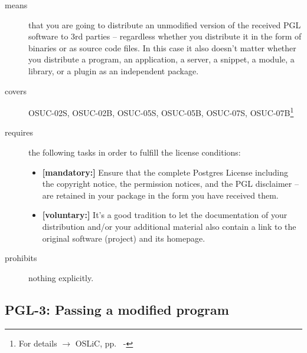\begin{description}

\item[means] that you are going to distribute an unmodified version of the
received PGL software to 3rd parties -- regardless whether you distribute it in
the form of binaries or as source code files. In this case it also
doesn't matter whether you distribute a program, an application, a server, a
snippet, a module, a library, or a plugin as an independent package.

\item[covers] OSUC-02S,  OSUC-02B, OSUC-05S, OSUC-05B, OSUC-07S,
OSUC-07B\footnote{For details $\rightarrow$ OSLiC, pp.\ \pageref{OSUC-02S-DEF} -
\pageref{OSUC-07B-DEF}}

\item[requires] the following tasks in order to fulfill the license conditions:
\begin{itemize}
  \item \textbf{[mandatory:]} Ensure that the complete Postgres License
  including the copyright notice, the permission notices, and the PGL disclaimer
  -- are retained in your package in the form you have received them.
  \item \textbf{[voluntary:]} It's a good tradition to let the documentation of
  your distribution and/or your additional material also contain a link to the
  original software (project) and its homepage.
\end{itemize}

\item[prohibits] nothing explicitly.

\end{description}

\subsection{PGL-3: Passing a modified program}
\label{OSUC-04S-PGL} \label{OSUC-04B-PGL}

